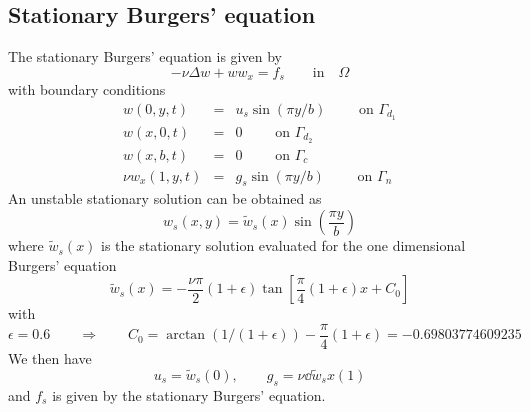\documentclass[12pt]{article}
\begin{document}
\subsection{Stationary Burgers' equation}
The stationary Burgers' equation is given by
\begin{equation*}
-\nu \Delta w + w w_{x} = f_s \qquad \mbox{in} \quad \Omega
\end{equation*}
with boundary conditions
\begin{eqnarray*}
w(0,y,t) &=& u_s \sin(\pi y/b) \qquad \mbox{ on } \Gamma_{d_1} \\
w(x,0,t) &=& 0 \qquad \mbox{ on } \Gamma_{d_2} \\
w(x,b,t) &=& 0 \qquad \mbox{ on } \Gamma_c \\
\nu w_x(1,y,t) &=& g_s \sin(\pi y/b) \qquad \mbox{ on } \Gamma_n
\end{eqnarray*}
An unstable stationary solution can be obtained as
\begin{equation*}
 w_s(x,y) = \tilde w_s(x) \sin{\left( \frac{\pi y}{b} \right)}
\end{equation*}
where $\tilde w_s(x)$ is the stationary solution evaluated for the one dimensional Burgers' equation
\begin{equation*}
 \tilde w_s (x) = - \frac{\nu \pi}{2} (1 + \epsilon) \tan{\left[ \frac{\pi}{4}(1+ \epsilon)x + C_0 \right]}
\end{equation*}
with
\[
\epsilon = 0.6 \qquad \Longrightarrow \qquad C_0 = \arctan(1/(1+\epsilon)) -    \frac{\pi}{4}(1 + \epsilon) = -0.69803774609235
\]
We then have
\[
u_s = \tilde{w}_s(0), \qquad g_s = \nu \dd{\tilde{w}_s}{x}(1)
\]
and $f_s$ is given by the stationary Burgers' equation.
\end{document}
